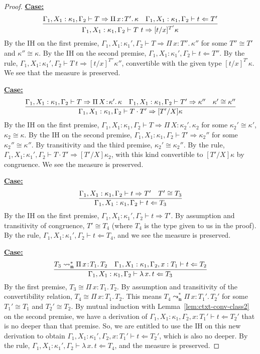 \documentclass{article}
\newcommand{\abs}[4]{{#1}\, #2\! : \! #3.\, #4}
\newcommand{\absu}[3]{{#1}\, #2.\, #3}
\newcommand{\leadstocs}[0]{\ensuremath{\leadsto_{\mathbf{n}}^*}}
\newcommand{\tpcheck}[0]{\Leftarrow}
\newcommand{\tpsynth}[0]{\Rightarrow}
\newcommand{\startcase}[1]{\vspace{#1} \noindent\textbf{\underline{Case:}}}
\begin{document}
\begin{proof}
  \startcase{.2cm}
  \[
    \infer{
      \Gamma_1,X_1:\kappa_1,\Gamma_2 \vdash T\ t \tpsynth [t/x]^{T'}\kappa
    }{
      \Gamma_1,X_1:\kappa_1,\Gamma_2 \vdash T \tpsynth \abs{\Pi}{x}{T'}{\kappa}
      & \Gamma_1,X_1:\kappa_1,\Gamma_2 \vdash t \tpcheck T'
    }
  \]
  By the IH on the first premise, \(\Gamma_1,X_1:\kappa_1',\Gamma_2 \vdash T
  \tpsynth \abs{\Pi}{x}{T''}{\kappa''}\) for some \(T'' \cong T'\) and
  \(\kappa'' \cong \kappa\).
  By the IH on the second premise, \(\Gamma_1,X_1:\kappa_1',\Gamma_2 \vdash t
  \tpcheck T''\).
  By the rule, \(\Gamma_1,X_1:\kappa_1',\Gamma_2 \vdash T\ t \tpsynth
  [t/x]^{T''}\kappa''\), convertible with the given type \([t/x]^{T'}\kappa\).
  We see that the measure is preserved.

  \startcase{.2cm}
  \[
    \infer{
      \Gamma_1,X_1:\kappa_1,\Gamma_2 \vdash T \cdot T' \tpsynth
      [T'/X]\kappa
    }{
      \Gamma_1,X_1:\kappa_1,\Gamma_2 \vdash T \tpsynth
      \abs{\Pi}{X}{\kappa'}{\kappa}
      & \Gamma_1,X_1:\kappa_1,\Gamma_2 \vdash T' \tpsynth \kappa''
      & \kappa' \cong \kappa''}
  \]
  By the IH on the first premise, \(\Gamma_1,X_1:\kappa_1,\Gamma_2 \vdash T
  \tpsynth \abs{\Pi}{X}{\kappa_2'}{\kappa_2}\) for some \(\kappa_2' \cong
  \kappa'\), \(\kappa_2 \cong \kappa\).
  By the IH on the second premise, \(\Gamma_1,X_1:\kappa_1,\Gamma_2 \vdash T'
  \tpsynth \kappa_2''\) for some \(\kappa_2'' \cong \kappa''\).
  By transitivity and the third premise, \(\kappa_2' \cong \kappa_2''\).
  By the rule, \(\Gamma_1,X_1:\kappa_1',\Gamma_2 \vdash T \cdot T' \tpsynth
  [T'/X]\kappa_2\), with this kind convertible to \([T'/X]\kappa\) by
  congruence.
  We see the measure is preserved.

  \startcase{.2cm}
  \[
    \infer{
      \Gamma_1,X_1:\kappa_1,\Gamma_2 \vdash t\tpcheck T_3
    }{
      \Gamma_1,X_1:\kappa_1,\Gamma_2 \vdash t\tpsynth T'
      & T' \cong T_3
    }
  \]
  By the IH on the first premise, \(\Gamma_1,X_1:\kappa_1',\Gamma_2 \vdash t
  \tpsynth T'\).
  By assumption and transitivity of congruence, \(T' \cong T_4\) (where \(T_4\)
  is the type given to us in the proof).
  By the rule, \(\Gamma_1,X_1:\kappa_1',\Gamma_2 \vdash t \tpcheck T_4\), and we
  see the measure is preserved.

  \startcase{.2cm}
  \[
    \infer{
      \Gamma_1,X_1:\kappa_1,\Gamma_2 \vdash \absu{\lambda}{x}{t} \tpcheck T_3
    }{
      T_3 \leadstocs \abs{\Pi}{x}{T_1}{T_2}
      & \Gamma_1,X_1:\kappa_1,\Gamma_2,x:T_1\vdash t\tpcheck T_2
    }
  \]
  By the first premise, \(T_3 \cong \abs{\Pi}{x}{T_1}{T_2}\).
  By assumption and transitivity of the convertibility relation, \(T_4 \cong
  \abs{\Pi}{x}{T_1}{T_2}\).
  This means \(T_4 \leadstocs \abs{\Pi}{x}{T_1'}{T_2'}\) for some \(T_1'
  \cong T_1\) and \(T_2' \cong T_2\).
  By mutual induction with Lemma~\ref{lem:ctxt-conv-class2} on the second
  premise, we have a derivation of \(\Gamma_1,X_1:\kappa_1,\Gamma_2,x:T_1'
  \vdash t \tpcheck T_2'\) that is no deeper than that premise.
  So, we are entitled to use the IH on this new derivation to obtain
  \(\Gamma_1,X_1:\kappa_1',\Gamma_2,x:T_1' \vdash t \tpcheck T_2'\), which is
  also no deeper.
  By the rule, \(\Gamma_1,X_1:\kappa_1',\Gamma_2 \vdash \absu{\lambda}{x}{t}
  \tpcheck T_4\), and the measure is preserved.
  

\end{proof}
\end{document}
